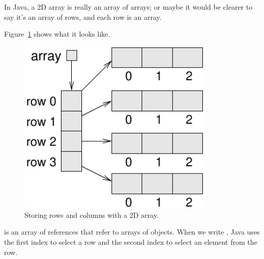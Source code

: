 In Java, a 2D array is really an array of arrays; or maybe it would be clearer to say it's an array of rows, and each row is an array.

%
%
%

Figure~\ref{fig:2D-array} shows what it looks like.

\begin{figure}[!ht]
\begin{center}
\includegraphics[width=265pt]{figs/2D-array.pdf}
\caption{Storing rows and columns with a 2D array.}
\label{fig:2D-array}
\end{center}
\end{figure}

 is an array of references that refer to arrays of  objects.
When we write , Java uses the first index to select a row and the second index to select an element from the row.

